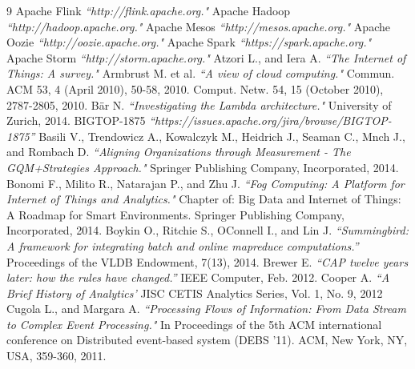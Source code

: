 \documentclass[a4paper, 12pt]{report}
\numberwithin{equation}{section}
\begin{document}







%





\listoffigures

\begin{thebibliography}{9}
	 Apache Flink
	\emph{``http://flink.apache.org."}
	 Apache Hadoop
	  \emph{``http://hadoop.apache.org."}
	 Apache Mesos
	\emph{``http://mesos.apache.org."}
	 Apache Oozie
    \emph{``http://oozie.apache.org."}
     Apache Spark
    \emph{``https://spark.apache.org."}
     Apache Storm
    \emph{``http://storm.apache.org."}
    Atzori L., and Iera A.
    \emph{``The Internet of Things: A survey."}
     Armbrust M. et al.
     \emph{``A view of cloud computing."}
     Commun. ACM 53, 4 (April 2010), 50-58, 2010.
    Comput. Netw. 54, 15 (October 2010), 2787-2805, 2010.
    B\"{a}r N. 
    \emph{``Investigating the Lambda architecture."} University of Zurich, 2014.
    BIGTOP-1875  
    \emph{``https://issues.apache.org/jira/browse/BIGTOP-1875''}
    Basili V., Trendowicz A., Kowalczyk M., Heidrich J., Seaman C., Mnch J., and Rombach D.
    \emph{``Aligning Organizations through Measurement - The GQM+Strategies Approach."}  Springer Publishing Company, Incorporated, 2014.
     Bonomi F., Milito R., Natarajan P., and Zhu J.
    \emph{``Fog Computing: A Platform for Internet of Things and Analytics."} Chapter of: Big Data and Internet of Things: A Roadmap for Smart Environments. Springer Publishing Company, Incorporated, 2014.
    Boykin O., Ritchie S., OConnell I., and Lin J. 
    \emph{``Summingbird: A framework for integrating batch and online mapreduce computations.''} Proceedings of the VLDB Endowment, 7(13), 2014.
     Brewer E.
    \emph{``CAP twelve years later: how the rules have changed.''} IEEE Computer, Feb. 2012.
 	Cooper A.
    \emph{``A Brief History of Analytics'} JISC CETIS Analytics Series, Vol. 1, No. 9, 2012
    Cugola L., and Margara A.  
    \emph{``Processing Flows of Information: From Data Stream to Complex Event Processing."} In Proceedings of the 5th ACM international conference on Distributed event-based system (DEBS '11). ACM, New York, NY, USA, 359-360, 2011.

\end{thebibliography}
\end{document}
